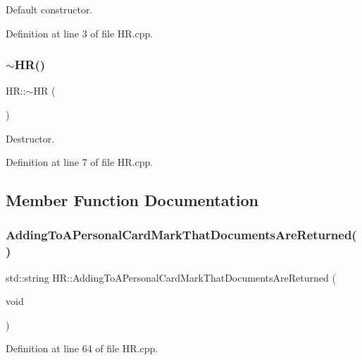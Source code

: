 Default constructor. 



Definition at line 3 of file H\+R.\+cpp.

\mbox{\label{class_h_r_a23fb380ea282a4193a7f05f81506c779}} 
\subsubsection{\texorpdfstring{$\sim$\+H\+R()}{~HR()}}
{\footnotesize\ttfamily H\+R\+::$\sim$\+HR (\begin{DoxyParamCaption}{ }\end{DoxyParamCaption})}



Destructor. 



Definition at line 7 of file H\+R.\+cpp.



\subsection{Member Function Documentation}
\mbox{\label{class_h_r_a896d89581c96f0dcedca7440d2798d15}} 
\subsubsection{\texorpdfstring{Adding\+To\+A\+Personal\+Card\+Mark\+That\+Documents\+Are\+Returned()}{AddingToAPersonalCardMarkThatDocumentsAreReturned()}}
{\footnotesize\ttfamily std\+::string H\+R\+::\+Adding\+To\+A\+Personal\+Card\+Mark\+That\+Documents\+Are\+Returned (\begin{DoxyParamCaption}\item[{void}]{ }\end{DoxyParamCaption})}



Definition at line 64 of file H\+R.\+cpp.

\mbox{\label{class_h_r_af3a791db3d60be02234605865c0979da}} 

